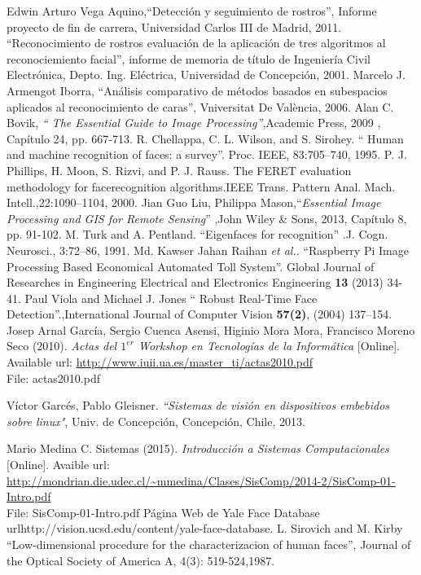 \documentclass[letterpaper,12pt]{article}
\begin{document}
\begin{thebibliography}{}

 Edwin Arturo Vega Aquino,``Detección y seguimiento de rostros'', Informe proyecto de fin de carrera, Universidad Carlos III de Madrid, 2011.
``Reconocimiento de rostros evaluación de la aplicación de tres algoritmos al reconociemiento facial'', informe de memoria de título de Ingeniería Civil Electrónica, Depto. Ing. Eléctrica, Universidad de Concepción, 2001. 
 Marcelo J. Armengot Iborra, ``Análisis comparativo de métodos basados en subespacios aplicados al reconocimiento de caras'', Vniversitat De València, 2006.
 Alan C. Bovik, \textit{`` The Essential Guide to Image Processing''},Academic Press, 2009 , Capítulo 24, pp. 667-713.
 R. Chellappa, C. L. Wilson, and S. Sirohey. `` Human and machine recognition of faces: a survey''. Proc. IEEE, 83:705–740, 1995.
P. J. Phillips, H. Moon, S. Rizvi, and P. J. Rauss. The FERET evaluation methodology for facerecognition algorithms.IEEE Trans. Pattern Anal. Mach. Intell.,22:1090–1104, 2000.
 Jian Guo Liu, Philippa Mason,``\textit{Essential Image Processing and GIS for Remote Sensing}'' ,John Wiley \& Sons, 2013, Capítulo 8, pp. 91-102.
 M. Turk and A. Pentland. ``Eigenfaces for recognition'' .J. Cogn. Neurosci., 3:72–86, 1991.
 Md. Kawser Jahan Raihan  \textit{et al.}. ``Raspberry Pi Image Processing Based Economical Automated Toll System''.
Global Journal of Researches in Engineering Electrical and Electronics Engineering  \textbf{13} (2013) 34-41.
 Paul Viola and Michael J. Jones
`` Robust Real-Time Face Detection''.,International Journal of Computer Vision \textbf{57(2)}, (2004) 137–154. 
Josep Arnal García, Sergio Cuenca Asensi, Higinio Mora Mora, Francisco Moreno Seco (2010). \textit{Actas del $1^{er}$ Workshop en Tecnologías de la Informática} [Online].
Available url: \url{http://www.iuii.ua.es/master_ti/actas2010.pdf}\\
File: actas2010.pdf

Víctor Garcés, Pablo Gleisner. \textit{``Sistemas de visión en dispositivos embebidos sobre linux"}, Univ. de Concepción, Concepción, Chile, 2013. 

 Mario Medina C. Sistemas (2015). \textit{Introducción a Sistemas Computacionales} [Online].
Avaible url: \url{http://mondrian.die.udec.cl/~mmedina/Clases/SisComp/2014-2/SisComp-01-Intro.pdf}\\
File: SisComp-01-Intro.pdf
 Página Web de Yale Face Database url{http://vision.ucsd.edu/content/yale-face-database}.
 L. Sirovich and M. Kirby  ``Low-dimensional procedure for the characterizacion of human faces'', Journal of the Optical Society of America A, 4(3): 519-524,1987.


\end{thebibliography}
\end{document}

